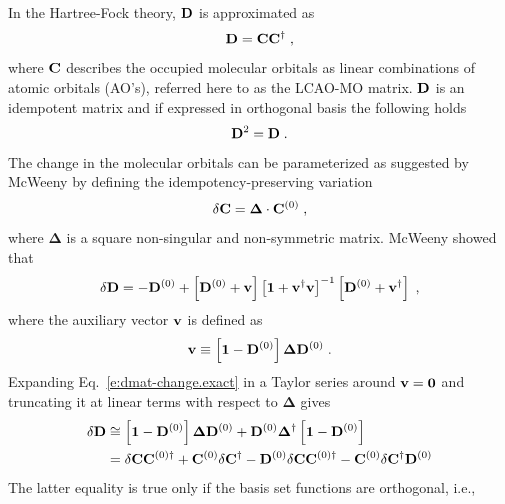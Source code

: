 \documentclass[aip,amsmath,amssymb,reprint,floatfix]{revtex4-1}
\newcommand{\BM}[1]{\bm{#1}}
\begin{document}
In the Hartree\hyp{}Fock theory,\cite{Roothaan.RevModPhys.1951} ${\bf D}$ is approximated as
%
\begin{equation}
 {\bf D} = {\bf C}{\bf C}^\dagger \;,
\end{equation}
%
where ${\bf C}$ describes the occupied molecular orbitals as linear combinations
of atomic orbitals (AO's), referred here to as the LCAO-MO matrix.
${\bf D}$ is an idempotent matrix and if expressed in orthogonal basis the following holds
%
\begin{equation}
 {\bf D}^2 = {\bf D} \;.
\end{equation}
%
The change in the molecular orbitals can be parameterized as suggested by McWeeny\cite{McWeeny.RevModPhys.1960}
by defining the idempotency\hyp{}preserving variation
%
\begin{equation}
 \delta {\bf C} = {\BM\Delta} \cdot {\bf C}^{(0)} \;,
\end{equation}
%
where $\BM\Delta$ is a square non\hyp{}singular and non\hyp{}symmetric matrix.
McWeeny showed that
%
\begin{equation} \label{e:dmat-change.exact}
 \delta {\bf D} = -{\bf D}^{(0)} + \left[ {\bf D}^{(0)} + {\bf v} \right]
                                   \left[ {\bf 1} + {\bf v}^\dagger{\bf v} \right]^{-1}
                                   \left[ {\bf D}^{(0)} + {\bf v}^\dagger \right] \;,
\end{equation}
%
where the auxiliary vector ${\bf v}$ is defined as
%
\begin{equation}
 {\bf v} \equiv \left[ {\bf 1} - {\bf D}^{(0)} \right] {\BM\Delta} {\bf D}^{(0)}  \;.
\end{equation}
%
Expanding Eq.~\eqref{e:dmat-change.exact} in a Taylor series around ${\bf v}={\bf 0}$ and
truncating it at linear terms with respect to ${\BM\Delta}$ gives
%
\begin{subequations} 
 \begin{align}
 \delta {\bf D} &\cong \left[ {\bf 1} - {\bf D}^{(0)} \right] {\BM\Delta} {\bf D}^{(0)} + 
                        {\bf D}^{(0)} {\BM\Delta}^\dagger \left[ {\bf 1} - {\bf D}^{(0)} \right]  
 \label{e:dD-1} \\  &= 
  \delta {\bf C}  {\bf C}^{(0)\dagger} + {\bf C}^{(0)}\delta {\bf C}^\dagger
           - {\bf D}^{(0)} \delta {\bf C}  {\bf C}^{{(0)}\dagger} - {\bf C}^{(0)}\delta {\bf C}^\dagger {\bf D}^{(0)} 
 \label{e:dD-2}
 \end{align}
\end{subequations}
%
The latter equality is true only if the basis set functions are orthogonal, i.e., 
\end{document}
